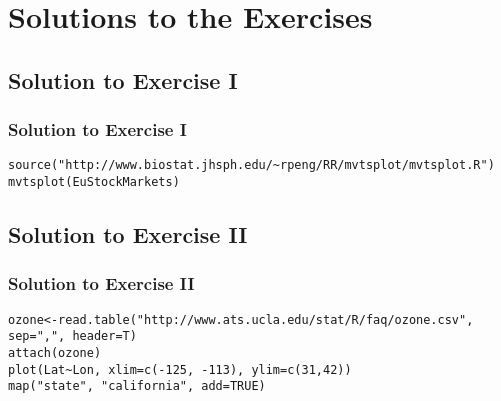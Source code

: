 \section[Solutions]{Solutions to the Exercises}
%

  \subsection{Solution to Exercise I}
  \begin{frame}[fragile]
  \frametitle{Solution to Exercise I}

			\begin{lstlisting}
source("http://www.biostat.jhsph.edu/~rpeng/RR/mvtsplot/mvtsplot.R")		
mvtsplot(EuStockMarkets)
			\end{lstlisting}
\end{frame}

  \subsection{Solution to Exercise II}
\begin{frame}[fragile]
  \frametitle{Solution to Exercise II}

			\begin{lstlisting}
ozone<-read.table("http://www.ats.ucla.edu/stat/R/faq/ozone.csv", sep=",", header=T)
attach(ozone)
plot(Lat~Lon, xlim=c(-125, -113), ylim=c(31,42))
map("state", "california", add=TRUE)
			\end{lstlisting}

\end{frame}

